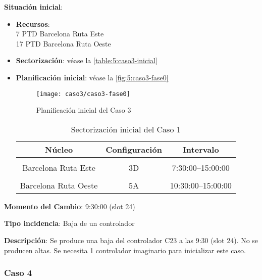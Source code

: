 \textbf{Situación inicial}:
\begin{itemize}[label={}]
	
	\item \textbf{Recursos}: \\
	7 PTD Barcelona Ruta Este \\
	17 PTD Barcelona Ruta Oeste
	
	\item \textbf{Sectorización}: véase la \autoref{table:5:caso3-inicial}
	
	\item \textbf{Planificación inicial}: véase la \autoref{fig:5:caso3-fase0}
	
	\begin{figure}[!h]
		\centering
		\texttt{[image: caso3/caso3-fase0]}
		\caption{Planificación inicial del Caso 3}
		\label{fig:5:caso3-fase0}
	\end{figure}

	\begin{table}[h]
		\centering
		\caption{Sectorización inicial del Caso 1}
		\begin{tabular}{ccc}
			\hline
			\textbf{Núcleo}      & \textbf{Configuración} & \textbf{Intervalo}   \\ \hline
			\multicolumn{1}{l}{} & \multicolumn{1}{l}{}   & \multicolumn{1}{l}{} \\
			Barcelona Ruta Este  & 3D                     & 7:30:00--15:00:00    \\
			\multicolumn{1}{l}{} & \multicolumn{1}{l}{}   & \multicolumn{1}{l}{} \\
			Barcelona Ruta Oeste & 5A                     & 10:30:00--15:00:00   \\ \hline
		\end{tabular}
		\label{table:5:caso3-inicial}
	\end{table}
	
\end{itemize}

\textbf{Momento del Cambio}: 9:30:00 (slot 24)

\textbf{Tipo incidencia}: Baja de un controlador

\textbf{Descripción}: Se produce una baja del controlador C23 a las 9:30 (slot 24). No se producen altas. Se necesita 1 controlador imaginario para inicializar este caso.


\subsubsection{Caso 4}

